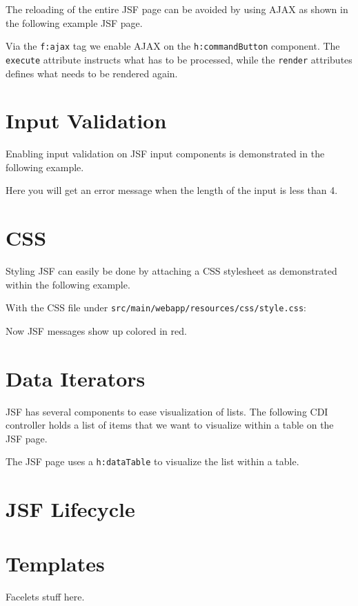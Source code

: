 The reloading of the entire JSF page can be avoided by using AJAX as shown in the following example JSF page.


Via the \texttt{f:ajax} tag we enable AJAX on the \texttt{h:commandButton} component.
The \texttt{execute} attribute instructs what has to be processed, while the \texttt{render} attributes defines what needs to be rendered again.

\section{Input Validation}

Enabling input validation on JSF input components is demonstrated in the following example.


Here you will get an error message when the length of the input is less than 4.

\section{CSS}

Styling JSF can easily be done by attaching a CSS stylesheet as demonstrated within the following example.


With the CSS file under \texttt{src/main/webapp/resources/css/style.css}:


Now JSF messages show up colored in red.

\section{Data Iterators}

JSF has several components to ease visualization of lists.
The following CDI controller holds a list of items that we want to visualize within a table on the JSF page.


The JSF page uses a \texttt{h:dataTable} to visualize the list within a table.



\section{JSF Lifecycle}


\section{Templates}

Facelets stuff here.